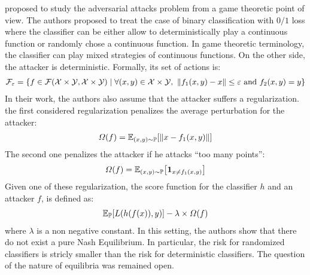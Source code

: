 \cite{pinot2020randomization} proposed to study the adversarial attacks problem from a game theoretic point of view. The authors proposed to treat the case of binary classification with $0/1$ loss where the classifier can be either allow to deterministically play a continuous function or randomly chose a continuous function. In game theoretic terminology, the classifier can play mixed strategies of continuous functions. On the other side, the attacker is deterministic. Formally, its set of actions is:
\begin{align*}
    \mathcal{F}_\varepsilon = \left\{f\in \mathcal{F}(\XX\times\YY,\XX\times\YY)\mid \forall (x,y)\in\XX\times\YY,~\lVert f_1(x,y)-x\rVert\leq \varepsilon\text{ and }f_2(x,y)=y\right\}
\end{align*}
In their work, the authors also assume that the attacker suffers a regularization. the first considered regularization penalizes the average perturbation for the attacker:
\begin{align*}
    \Omega(f) = \mathbb{E}_{(x,y)\sim\PP}\left[\lVert x- f_1(x,y)\rVert\right]    
\end{align*}
The second one penalizes the attacker if he attacks ``too many points'':
\begin{align*}
    \Omega(f) = \mathbb{E}_{(x,y)\sim\PP}\left[\mathbf{1}_{x\neq f_1(x,y)}\right]    
\end{align*}
Given one of these regularization, the score function for the classifier $h$ and an   attacker $f$, is defined as:
\begin{align*}
 \mathbb{E}_\PP\left[L(h(f(x)),y)\right]-\lambda\times\Omega(f)
\end{align*}
where $\lambda$ is a non negative constant. In this setting,  the authors show that there do not exist a pure Nash Equilibrium. In particular, the risk for randomized classifiers is stricly smaller than the risk for deterministic classifiers. The question of the nature of equilibria was remained open.

